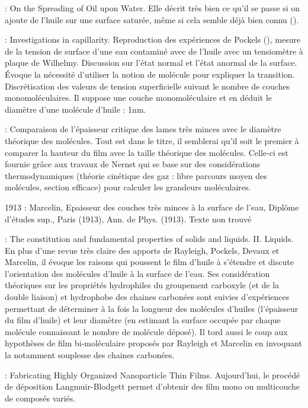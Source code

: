 \documentclass[12pt,a4paper]{article}
\begin{document}
\cite{Pockels1894} : On the Spreading of Oil upon Water.
Elle décrit très bien ce qu'il se passe si on ajoute de l'huile sur une surface saturée, même si cela semble déjà bien connu (\cite{Rayleigh1892}).

\cite{Rayleigh1899} : Investigations in capillarity.
Reproduction des expériences de Pockels (\cite{Pockels1891}), mesure de la tension de surface d'une eau contaminé avec de l'huile avec un tensiomètre à plaque de Wilhelmy.
Discussion sur l'état normal et l'état anormal de la surface.
Évoque la nécessité d'utiliser la notion de molécule pour expliquer la transition.
Discrétisation des valeurs de tension superficielle suivant le nombre de couches monomoléculaires.
Il suppose une couche monomoléculaire et en déduit le diamètre d'une molécule d'huile : \unit{1}{nm}.

\cite{Devaux1904} : Comparaison de l'épaisseur critique des lames très minces avec le diamètre théorique des molécules.
Tout est dans le titre, il semblerai qu'il soit le premier à comparer la hauteur du film avec la taille théorique des molécules.
Celle-ci est fournie grâce aux travaux de Nernst qui se base sur des considérations thermodynamiques (théorie cinétique des gaz : libre parcours moyen des molécules, section efficace) pour calculer les grandeurs moléculaires.

1913 : Marcelin, Epaisseur des couches très minces à la surface de l'eau, Diplôme d'études sup., Paris (1913), Ann. de Phys. (1913). Texte non trouvé

\cite{Langmuir1917} : The constitution and fundamental properties of solids and liquids. II. Liquids.
En plus d'une revue très claire des apports de Rayleigh, Pockels, Devaux et Marcelin, il évoque les raisons qui poussent le film d'huile à s'étendre et discute l'orientation des molécules d'huile à la surface de l'eau.
Ses considération théoriques sur les propriétés hydrophiles du groupement carboxyle (et de la double liaison) et hydrophobe des chaines carbonées sont suivies d'expériences permettant de déterminer à la fois la longueur des molécules d'huiles (l'épaisseur du film d'huile) et leur diamètre (en estimant la surface occupée par chaque molécule connaissant le nombre de molécule déposé).
Il tord aussi le coup aux hypothèses de film bi-moléculaire proposés par Rayleigh et Marcelin en invoquant la notamment souplesse des chaines carbonées.

\cite{BiolinScientific2011} : Fabricating Highly Organized Nanoparticle Thin Films.
Aujourd'hui, le procédé de déposition Langmuir-Blodgett permet d'obtenir des film mono ou multicouche de composés variés.
\end{document}
